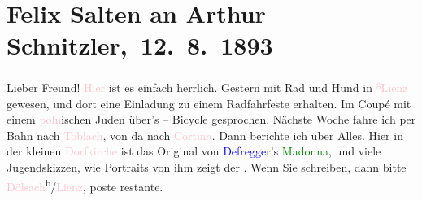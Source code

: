 

\renewcommand{\erwaehntePersonen}{Personen: Franz Defregger, Josef Putzenbacher, Gustav Schwarzkopf, Emil Schwarzkopf, Max Schwarzkopf, Rudolf Schwarzkopf}
\renewcommand{\erwaehnteOrte}{Orte: Cortina d'Ampezzo, Dölsach, Lienz, Pfarrkirche Dölsach, Polen, Putzenbacher, Toblach, Wien}
\renewcommand{\erwaehnteWerke}{Werke: Heilige Familie}
\section[ Felix Salten an Arthur Schnitzler, 12. 8. 1893]{Felix Salten an Arthur Schnitzler, 12. 8. 1893}
\nopagebreak{}
\rehead{ }\normalsize\beginnumbering{}
\toendnotes[C]{\smallbreak\pagebreak[2]}
\toendnotes[C]{\smallbreak}
\pstart
           \noindent{}{\pb}Lieber Freund!{ }\textcolor{pink}{Hier}{}\ledrightnote{{$\rightarrow$}\textcolor{pink}{Dölsach}} ist es einfach herrlich.
                  Gestern mit Rad und Hund in \textcolor{pink}{}{}\ledrightnote{\textcolor{pink}{Dölsach}}{ }\textcolor{pink}{\substVorne{}\textsuperscript{g}\substDazwischen{}L\substHinten{}ienz}{}\ledrightnote{\textcolor{pink}{Lienz}} gewesen, und dort eine Einladung zu einem Radfahrfeste erhalten.
               Im Coupé mit einem \textcolor{pink}{poln}{}\ledrightnote{\textcolor{pink}{Polen}}ischen Juden über’s –
               Bicycle gesprochen. Nächste Woche fahre ich per Bahn nach \textcolor{pink}{Toblach}{}\ledrightnote{\textcolor{pink}{Toblach}}, von da nach \textcolor{pink}{Cortina}{}\ledrightnote{\textcolor{pink}{Cortina d'Ampezzo}}. Dann berichte ich über Alles. Hier in der kleinen \textcolor{pink}{Dorfkirche}{}\ledrightnote{{$\rightarrow$}\textcolor{pink}{Pfarrkirche Dölsach}} ist das Original von \textcolor{blue}{Defregger}{}\ledrightnote{\textcolor{blue}{Franz Defregger}}’s \textcolor{green}{Madonna}{}\ledrightnote{\textcolor{green}{Heilige Familie}}, und viele Jugendskizzen, wie Portraits von ihm zeigt der \label{K_L03126-1v}\label{K_L03126-1h}. Wenn Sie schreiben, dann {\pb}bitte \textcolor{pink}{Dölsach}{}\ledrightnote{\textcolor{pink}{Dölsach}}{ }\textsuperscript{b}/\textcolor{pink}{Lienz}{}\ledrightnote{\textcolor{pink}{Lienz}}, poste
               restante.\pend
           
